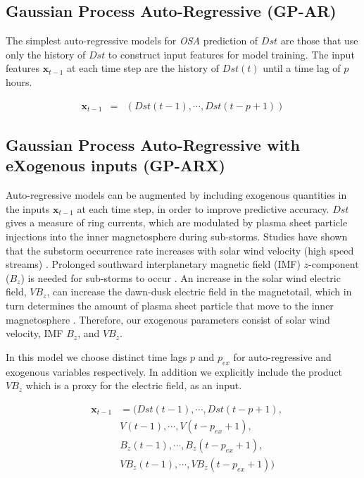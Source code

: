 \documentclass[referee,a4paper,12pt,traditabstract]{swsc}
\begin{document}
\begin{linenumbers}
\subsection{Gaussian Process Auto-Regressive (GP-AR)} \label{sec:gpar}

The simplest auto-regressive models for \emph{OSA} prediction of $Dst$ are those that use only the history of $Dst$ to construct input features for model training. The input features $\mathbf{x}_{t-1}$ at each time step are the history of $Dst(t)$ until a time lag of $p$ hours.

\begin{eqnarray*}
    \mathbf{x}_{t-1} & = & \left(Dst(t-1), \cdots , Dst(t-p+1)\right)
\end{eqnarray*}

\subsection{Gaussian Process Auto-Regressive with eXogenous inputs (GP-ARX)} \label{sec:gparx}

Auto-regressive models can be augmented by including exogenous quantities in the inputs $\mathbf{x}_{t-1}$ at each time step, in order to improve predictive accuracy. $Dst$ gives a measure of ring currents, which are modulated by plasma sheet particle injections into the inner magnetosphere during sub-storms. Studies have shown that the substorm occurrence rate increases with solar wind velocity (high speed streams) \citep{Kissinger2011,Newell2016}. Prolonged southward interplanetary magnetic field (IMF) $z$-component ($B_z$) is needed for sub-storms to occur \citep{McPherron1986}. An increase in the solar wind electric field, $VB_z$, can increase the dawn-dusk electric field in the magnetotail, which in turn determines the amount of plasma sheet particle that move to the inner magnetosphere \citep{Friedel2001}. Therefore, our exogenous parameters consist of solar wind velocity, IMF $B_z$, and $VB_z$.   

In this model we choose distinct time lags $p$ and $p_{ex}$ for auto-regressive and exogenous variables respectively. In addition we explicitly include the product $V B_z$ which is a proxy for the electric field, as an input.
    
\begin{eqnarray*}
        & \mathbf{x}_{t-1} & = (Dst(t-1), \cdots , Dst(t-p+1), \\
        & \ \ \ \ \ & V(t-1), \cdots, V(t-p_{ex}+1),\\
        & \ \ \ \ \ & B_{z}(t-1), \cdots, B_{z}(t-p_{ex}+1),\\
        & \ \ \ \ \ & V B_{z}(t-1), \cdots, V B_{z}(t-p_{ex}+1))
\end{eqnarray*}


\end{linenumbers}
\end{document}
